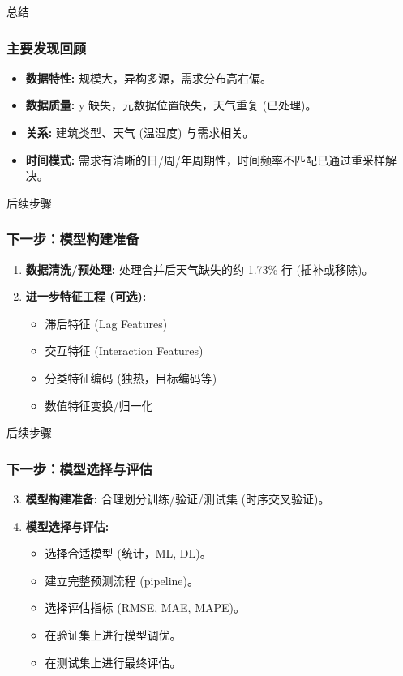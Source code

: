 \documentclass{beamer} %
\begin{document}
\begin{frame}{总结}
    \frametitle{主要发现回顾}
    \begin{itemize}
        \item \textbf{数据特性:} 规模大，异构多源，需求分布高右偏。
        \item \textbf{数据质量:} y 缺失，元数据位置缺失，天气重复 (已处理)。
        \item \textbf{关系:} 建筑类型、天气 (温湿度) 与需求相关。
        \item \textbf{时间模式:} 需求有清晰的日/周/年周期性，时间频率不匹配已通过重采样解决。
    \end{itemize}
\end{frame}

\begin{frame}{后续步骤}
    \frametitle{下一步：模型构建准备}
    \begin{enumerate}
        \item \textbf{数据清洗/预处理:} 处理合并后天气缺失的约 1.73\% 行 (插补或移除)。
        \item \textbf{进一步特征工程 (可选):}
        \begin{itemize}
            \item 滞后特征 (Lag Features)
            \item 交互特征 (Interaction Features)
            \item 分类特征编码 (独热，目标编码等)
            \item 数值特征变换/归一化
        \end{itemize}
    \end{enumerate}
\end{frame}

\begin{frame}{后续步骤}
    \frametitle{下一步：模型选择与评估}
    \begin{enumerate}
        \setcounter{enumi}{2} %
        \item \textbf{模型构建准备:} 合理划分训练/验证/测试集 (时序交叉验证)。
        \item \textbf{模型选择与评估:}
        \begin{itemize}
            \item 选择合适模型 (统计，ML, DL)。
            \item 建立完整预测流程 (pipeline)。
            \item 选择评估指标 (RMSE, MAE, MAPE)。
            \item 在验证集上进行模型调优。
            \item 在测试集上进行最终评估。
        \end{itemize}
    \end{enumerate}
\end{frame}
\end{document}
